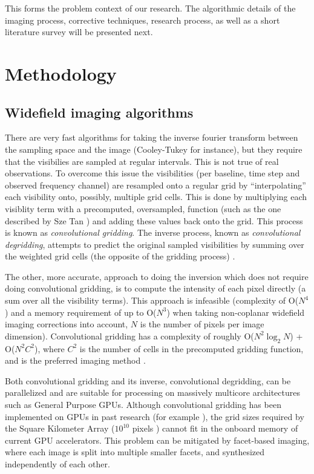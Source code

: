 \documentclass[a4paper, two column]{article}
\begin{document}
This forms the problem context of our research. The algorithmic details of the imaging process, corrective techniques, research process, as well as a short literature survey will be presented next.

\section{Methodology}
\subsection{Widefield imaging algorithms}
There are very fast algorithms for taking the inverse fourier transform between the sampling space and the image (Cooley-Tukey for instance), but they require that the visibilies are sampled at regular intervals. This 
is not true of real observations. To overcome this issue the visibilities (per baseline, time step and observed frequency channel) are resampled onto a regular grid by ``interpolating'' each visibility onto, possibly, 
multiple grid cells. This is done by multiplying each visiblity term with a precomputed, oversampled, function (such as the one described by Sze Tan \cite{tan1986aperture}) and adding these values back onto the grid. 
This process is known as \textit{convolutional gridding}. The inverse process, known as \textit{convolutional degridding}, attempts to predict the original sampled visibilities by summing over the weighted grid 
cells (the opposite of the gridding process) \cite{taylor1999synthesis}.

The other, more accurate, approach to doing the inversion which does not require doing convolutional gridding, is to compute the intensity of each pixel directly (a sum over all the visibility terms). This approach is infeasible
(complexity of O($N^4$) and a memory requirement of up to O($N^3$) when taking non-coplanar widefield imaging corrections into account, $N$ is the number of pixels per image dimension). Convolutional gridding has a complexity 
of roughly O($N^2\log_2{N}$) + O($N^2C^2$), where $C^2$ is the number of cells in the precomputed gridding function, and is the preferred imaging method \cite[Lecture 7]{taylor1999synthesis}.

Both convolutional gridding and its inverse, convolutional degridding, can be parallelized and are suitable for processing on massively multicore architectures such as General Purpose GPUs. Although convolutional gridding 
has been implemented on GPUs in past research (for example \cite{romein2012efficient}), the grid sizes required by the Square Kilometer Array ($10^{10}$ pixels \cite{cornwell2012wide}) cannot fit in the onboard memory 
of current GPU accelerators. This problem can be mitigated by facet-based imaging, where each image is split into multiple smaller facets, and synthesized independently of each other. 
\end{document}
